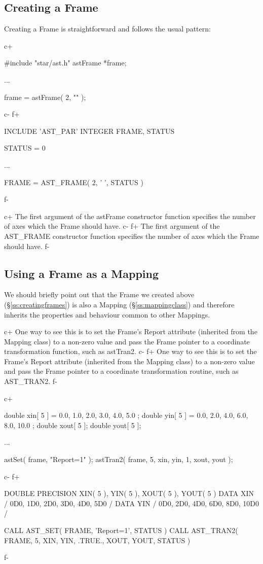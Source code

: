 \documentclass[twoside,11pt]{starlink}
\providecommand{\secref}[1]{\S\ref{#1}}
\begin{document}
\subsection{\label{ss:creatingframes}Creating a Frame}

Creating a Frame is straightforward and follows the usual pattern:

c+
\small
\begin{terminalv}
#include "star/ast.h"
astFrame *frame;

...

frame = astFrame( 2, "" );
\end{terminalv}
\normalsize
c-
f+
\small
\begin{terminalv}
      INCLUDE 'AST_PAR'
      INTEGER FRAME, STATUS

      STATUS = 0

      ...

      FRAME = AST_FRAME( 2, ' ', STATUS )
\end{terminalv}
\normalsize
f-

c+
The first argument of the astFrame constructor function specifies the
number of axes which the Frame should have.
c-
f+
The first argument of the AST\_FRAME constructor function specifies
the number of axes which the Frame should have.
f-

\subsection{\label{ss:frameasmapping}Using a Frame as a Mapping}

We should briefly point out that the Frame we created above
(\secref{ss:creatingframes}) is also a Mapping
(\secref{ss:mappingclass}) and therefore inherits the properties and
behaviour common to other Mappings.

c+
One way to see this is to set the Frame's Report attribute (inherited
from the Mapping class) to a non-zero value and pass the Frame pointer
to a coordinate transformation function, such as astTran2.
c-
f+
One way to see this is to set the Frame's Report attribute (inherited
from the Mapping class) to a non-zero value and pass the Frame pointer
to a coordinate transformation routine, such as AST\_TRAN2.
f-

c+
\small
\begin{terminalv}
double xin[ 5 ] = { 0.0, 1.0, 2.0, 3.0, 4.0, 5.0 };
double yin[ 5 ] = { 0.0, 2.0, 4.0, 6.0, 8.0, 10.0 };
double xout[ 5 ];
double yout[ 5 ];

...

astSet( frame, "Report=1" );
astTran2( frame, 5, xin, yin, 1, xout, yout );
\end{terminalv}
\normalsize
c-
f+
\small
\begin{terminalv}
      DOUBLE PRECISION XIN( 5 ), YIN( 5 ), XOUT( 5 ), YOUT( 5 )
      DATA XIN / 0D0, 1D0, 2D0, 3D0, 4D0, 5D0 /
      DATA YIN / 0D0, 2D0, 4D0, 6D0, 8D0, 10D0 /

      CALL AST_SET( FRAME, 'Report=1', STATUS )
      CALL AST_TRAN2( FRAME, 5, XIN, YIN, .TRUE., XOUT, YOUT, STATUS )
\end{terminalv}
\normalsize
f-
\end{document}
